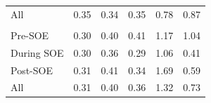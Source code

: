 \begin{table}[!h]
{\begin{tabular}[t]{lrrrrr}
\hspace{1em}All & 0.35 & 0.34 & 0.35 & 0.78 & 0.87\\
\addlinespace[0.3em]
\multicolumn{6}{l}{\textbf{Margin}}\\
\hspace{1em}Pre-SOE & 0.30 & 0.40 & 0.41 & 1.17 & 1.04\\
\hspace{1em}During SOE & 0.30 & 0.36 & 0.29 & 1.06 & 0.41\\
\hspace{1em}Post-SOE & 0.31 & 0.41 & 0.34 & 1.69 & 0.59\\
\hspace{1em}All & 0.31 & 0.40 & 0.36 & 1.32 & 0.73\\
\bottomrule
\end{tabular}}
\end{table}
